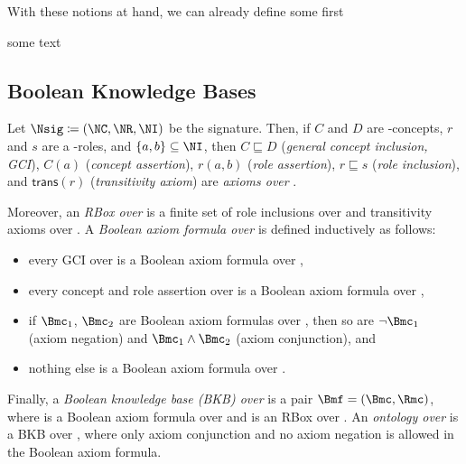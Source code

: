 

With these notions at hand, we can already define some first 

some text

\begin{example}
  
\end{example}




\subsection{Boolean Knowledge Bases}
\label{sec:dl-axioms}


\begin{definition}
  Let $\Nsig\coloneqq(\NC,\NR,\NI)$ be the signature. Then, if $C$ and $D$ are \Nsig-concepts, $r$
  and $s$ are a \Nsig-roles, and $\{a,b\}\subseteq\NI$, then $C \sqsubseteq D$ (\emph{general concept inclusion,
    GCI}), $C(a)$ (\emph{concept assertion}), $r(a,b)$ (\emph{role assertion}), $r \sqsubseteq s$
  (\emph{role inclusion}), and $\mathsf{trans}(r)$ (\emph{transitivity axiom}) are
  \emph{axioms over \Nsig}.

  Moreover, an \emph{RBox \Rmc over \Nsig} is a finite set of role inclusions over \Nsig and
  transitivity axioms over \Nsig. A \emph{Boolean axiom formula over \Nsig} is defined inductively
  as follows:
  \begin{itemize}
  \item every GCI over \Nsig is a Boolean axiom formula over \Nsig,
  \item every concept and role assertion over \Nsig is a Boolean axiom formula over \Nsig,
  \item if $\Bmc_{1}$, $\Bmc_{2}$ are Boolean axiom formulas over \Nsig, then so are $\lnot\Bmc_{1}$
    (axiom negation) and $\Bmc_{1}\land\Bmc_{2}$ (axiom conjunction), and
  \item nothing else is a Boolean axiom formula over \Nsig.
  \end{itemize}

  Finally, a \emph{Boolean knowledge base (BKB) over \Nsig} is a pair $\Bmf = (\Bmc, \Rmc)$, where
  \Bmc is a Boolean axiom formula over \Nsig and \Rmc is an RBox over \Nsig. An \emph{ontology over
    \Nsig} is a BKB over \Nsig, where only axiom conjunction and no axiom negation is allowed in the
  Boolean axiom formula.
\end{definition}

